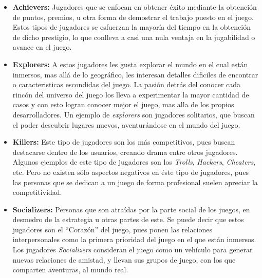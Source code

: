 \begin{itemize}
    \item {\bf Achievers:}
        Jugadores que se enfocan en obtener éxito mediante la obtención de puntos,
        premios, u otra forma de demostrar el trabajo puesto en el juego.
        Estos tipos de jugadores se esfuerzan la mayoría del tiempo en la obtención
        de dicho prestigio, lo que conlleva a casi una nula ventaja en la
        jugabilidad o avance en el juego.

    \item {\bf Explorers:}
        A estos jugadores les gusta explorar el mundo en el cual están inmersos,
        mas allá de lo geográfico, les interesan detalles dificiles de encontrar o
        caracteristicas escondidas del juego.
        La pasión detrás del conocer cada rincón del universo del juego los lleva
        a experimentar la mayor cantidad de casos y con esto logran conocer mejor
        el juego, mas alla de los propios desarrolladores.
        Un ejemplo de \emph{explorers} son jugadores solitarios, que buscan el
        poder descubrir lugares nuevos, aventurándose en el mundo del juego.

    \item {\bf Killers:}
        Este tipo de jugadores son los más competitivos, pues buscan destacarse
        dentro de los usuarios, creando drama entre otros jugadores.
        Algunos ejemplos de este tipo de jugadores son los \emph{Trolls},
        \emph{Hackers}, \emph{Cheaters}, etc.
        Pero no existen sólo aspectos negativos en éste tipo de jugadores,
        pues las personas que se dedican a un juego de forma profesional
        suelen apreciar la competitividad.

    \item {\bf Socializers:}
        Personas que son atraídas por la parte social de los juegos,
        en desmedro de la estrategia u otras partes de este.
        Se puede decir que estos jugadores son el ``Corazón'' del juego,
        pues ponen las relaciones interpersonales como la primera prioridad
        del juego en el que están inmersos.
        Los jugadores \emph{Socializers} consideran el juego
        como un vehículo para generar nuevas relaciones de amistad, y llevan
        sus grupos de juego, con los que comparten aventuras, al mundo real.

\end{itemize}

